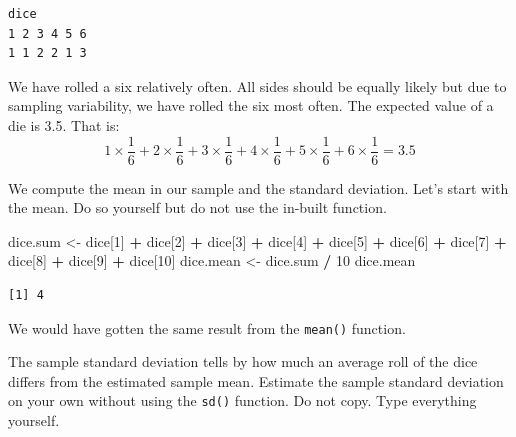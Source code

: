 \documentclass[]{article}
\newenvironment{Shaded}{\begin{snugshade}}{\end{snugshade}}
\newcommand{\DecValTok}[1]{\textcolor[rgb]{0.00,0.00,0.81}{#1}}
\newcommand{\StringTok}[1]{\textcolor[rgb]{0.31,0.60,0.02}{#1}}
\newcommand{\OperatorTok}[1]{\textcolor[rgb]{0.81,0.36,0.00}{\textbf{#1}}}
\newcommand{\NormalTok}[1]{#1}
\theoremstyle{definition}
\theoremstyle{definition}
\theoremstyle{definition}
\theoremstyle{remark}
\begin{document}
\begin{verbatim}
dice
1 2 3 4 5 6 
1 1 2 2 1 3 
\end{verbatim}

We have rolled a six relatively often. All sides should be equally
likely but due to sampling variability, we have rolled the six most
often. The expected value of a die is 3.5. That is:
\[ 1 \times \frac{1}{6} + 2 \times \frac{1}{6} + 3 \times \frac{1}{6} + 4 \times \frac{1}{6} + 5 \times \frac{1}{6} + 6 \times \frac{1}{6} = 3.5\]

We compute the mean in our sample and the standard deviation. Let's
start with the mean. Do so yourself but do not use the in-built
function.

\begin{Shaded}
\begin{Highlighting}[]
\NormalTok{dice.sum <-}\StringTok{ }\NormalTok{dice[}\DecValTok{1}\NormalTok{] }\OperatorTok{+}\StringTok{ }\NormalTok{dice[}\DecValTok{2}\NormalTok{] }\OperatorTok{+}\StringTok{ }\NormalTok{dice[}\DecValTok{3}\NormalTok{] }\OperatorTok{+}\StringTok{ }\NormalTok{dice[}\DecValTok{4}\NormalTok{] }\OperatorTok{+}\StringTok{ }\NormalTok{dice[}\DecValTok{5}\NormalTok{] }\OperatorTok{+}\StringTok{ }\NormalTok{dice[}\DecValTok{6}\NormalTok{] }\OperatorTok{+}\StringTok{ }\NormalTok{dice[}\DecValTok{7}\NormalTok{] }\OperatorTok{+}\StringTok{ }\NormalTok{dice[}\DecValTok{8}\NormalTok{] }\OperatorTok{+}\StringTok{ }\NormalTok{dice[}\DecValTok{9}\NormalTok{] }\OperatorTok{+}\StringTok{ }\NormalTok{dice[}\DecValTok{10}\NormalTok{]}
\NormalTok{dice.mean <-}\StringTok{ }\NormalTok{dice.sum }\OperatorTok{/}\StringTok{ }\DecValTok{10}  
\NormalTok{dice.mean}
\end{Highlighting}
\end{Shaded}

\begin{verbatim}
[1] 4
\end{verbatim}

We would have gotten the same result from the \texttt{mean()} function.

The sample standard deviation tells by how much an average roll of the
dice differs from the estimated sample mean. Estimate the sample
standard deviation on your own without using the \texttt{sd()} function.
Do not copy. Type everything yourself.
\end{document}
